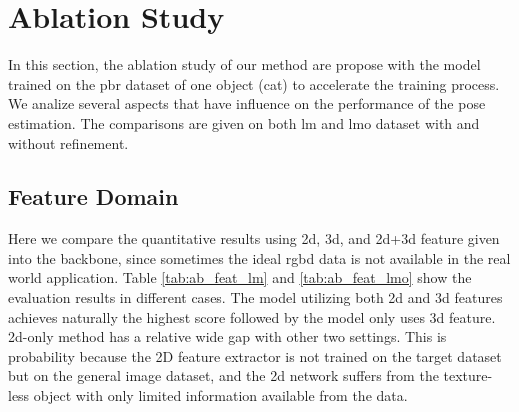 \documentclass[12pt,DIV14,BCOR12mm,a4paper,footinclude=false,headinclude,parskip=half-,twoside,openright,cleardoublepage=empty,toc=index,bibliography=totoc,listof=totoc]{scrreprt}
\numberwithin{equation}{chapter}
\begin{document}
\section{Ablation Study}
In this section, the ablation study of our method are propose with the model trained on the \gls{pbr} dataset of one object (cat) to accelerate the training process. We analize several aspects that have influence on the performance of the pose estimation. The comparisons are given on both \gls{lm} and \gls{lmo} dataset with and without refinement.
\subsection{Feature Domain}
Here we compare the quantitative results using \gls{2d}, \gls{3d}, and \gls{2d}+\gls{3d} feature given into the backbone, since sometimes the ideal \gls{rgbd} data is not available in the real world application. Table \ref{tab:ab_feat_lm} and \ref{tab:ab_feat_lmo} show the evaluation results in different cases. The model utilizing both \gls{2d} and \gls{3d} features achieves naturally the highest score followed by the model only uses \gls{3d} feature. \gls{2d}-only method has a relative wide gap with other two settings. This is probability because the 2D feature extractor is not trained on the target dataset but on the general image dataset, and the \gls{2d} network suffers from the texture-less object with only limited information available from the data.
\end{document}
